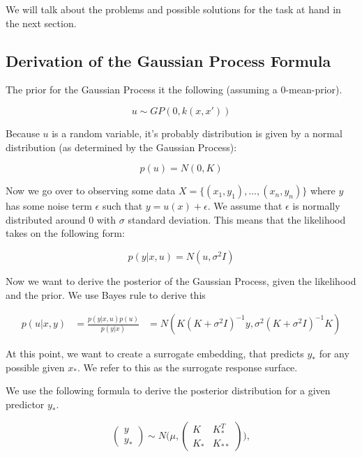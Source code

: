 We will talk about the problems and possible solutions for the task at hand in the next section.

\subsection{Derivation of the Gaussian Process Formula}
The prior for the Gaussian Process it the following (assuming a 0-mean-prior).

\begin{equation}
u \sim GP(0, k(x, x'))
\end{equation}

Because $u$ is a random variable, it's probably distribution is given by a normal distribution (as determined by the Gaussian Process):

\begin{equation}
p(u) = N ( 0, K )
\end{equation}

Now we go over to observing some data $ X = \{ (x_1, y_1), \ldots, (x_n, y_n) \} $ where $y$ has some noise term $\epsilon$ such that $y = u(x) + \epsilon$.
We assume that $\epsilon$ is normally distributed around $0$ with $\sigma$ standard deviation.
This means that the likelihood takes on the following form:

\begin{equation}
p(y | x, u) = N (u, \sigma^2 I)
\end{equation}


Now we want to derive the posterior of the Gaussian Process, given the likelihood and the prior.
We use Bayes rule to derive this

\begin{align}
p(u | x, y) &= \frac{ p(y | x, u) p(u) }{p(y | x)}
& = N( K(K +\sigma^2 I)^{-1}y, \sigma^2 (K + \sigma^2 I)^{-1} K )
\end{align}

At this point, we want to create a surrogate embedding, that predicts $y_*$ for any possible given $x_*$. 
We refer to this as the surrogate response surface.

We use the following formula to derive the posterior distribution for a given predictor $y_*$.

\begin{equation}
\begin{pmatrix} y \\
y_* \end{pmatrix} \sim N\Biggl(\mu,\begin{pmatrix} K & K^T_*\\
 K_* & K_{**} \end{pmatrix}\Biggr),
\end{equation}

